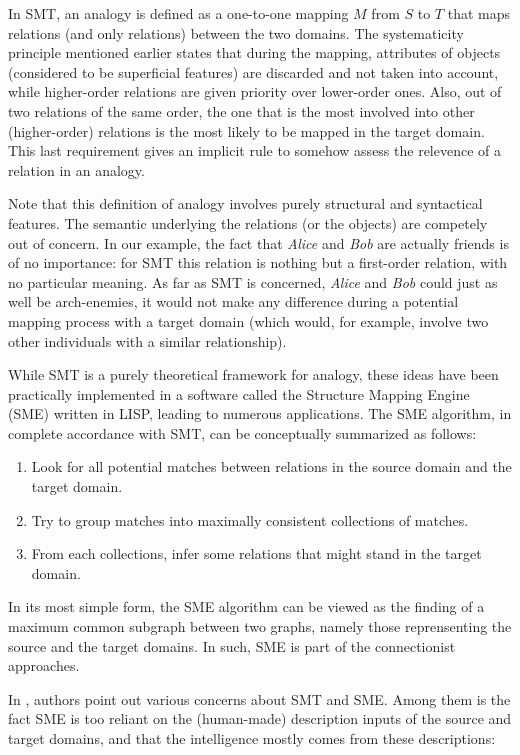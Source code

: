 In SMT, an analogy is defined as a one-to-one mapping $M$ from $S$ to $T$ that maps
relations (and only relations) between the two domains. The systematicity
principle mentioned earlier states that during the mapping, attributes of
objects (considered to be superficial features) are discarded and not taken
into account, while higher-order relations are given priority over lower-order
ones. Also, out of two relations of the same order, the one that is the most
involved into other (higher-order) relations is the most likely to be mapped in
the target domain. This last requirement gives an implicit rule to somehow
assess the relevence of a relation in an analogy.

Note that this definition of analogy involves purely structural and syntactical
features. The semantic underlying the relations (or the objects) are competely
out of concern. In our example, the fact that \textit{Alice} and \textit{Bob}
are actually friends is of no importance: for SMT this relation is nothing but
a first-order relation, with no particular meaning. As far as SMT is concerned,
\textit{Alice} and \textit{Bob} could just as well be arch-enemies, it would
not make any difference during a potential mapping process with a target domain
(which would, for example, involve two other individuals with a similar
relationship).

While SMT is a purely theoretical framework for analogy, these ideas have been
practically implemented in a software called the Structure Mapping Engine (SME)
\cite{FalForKenGen89} written in LISP, leading to numerous
applications. The SME algorithm, in complete accordance with SMT,
can be conceptually summarized as follows:
\begin{enumerate}
    \item Look for all potential matches between relations in the source domain
      and the target domain.
    \item Try to group matches into maximally consistent collections of
      matches.
    \item From each collections, infer some relations that might stand in the
      target domain.
\end{enumerate}
In its most simple form, the SME algorithm can be viewed as the finding of a
maximum common subgraph between two graphs, namely those reprensenting the
source and the target domains. In such, SME is part of the connectionist
approaches.

In  \cite{ChaFreHof92}, authors point out various concerns about SMT and SME.
Among them is the fact SME is too reliant on the (human-made) description
inputs of the source and target domains, and that the intelligence mostly comes
from these descriptions:

